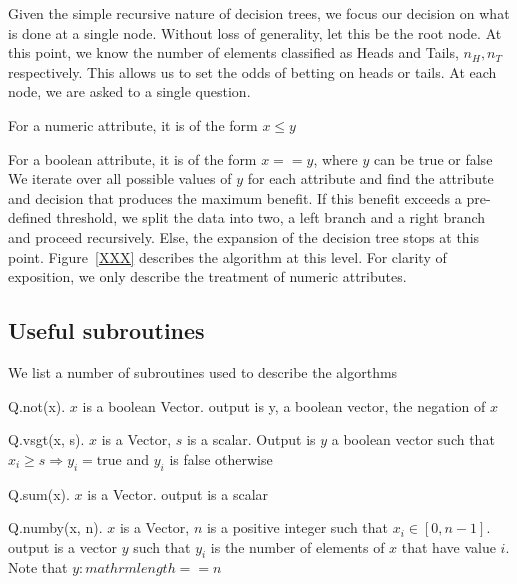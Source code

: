 Given the simple recursive nature of decision trees, we focus our 
decision on what is done at a single node. Without loss of generality, 
let this be the root node. At this point, we know the number of elements
classified as Heads and Tails, \(n_H, n_T\) respectively. This allows us to set
the odds of betting on heads or tails. At each node, we are asked to a single
question. 
\bi
\item For a numeric attribute, it is of the form \(x \leq y\)
\item For a boolean attribute, it is of the form \(x == y\), where 
\(y\) can be true or false
\ei
We iterate over all possible values of \(y\) for each attribute and find the
attribute and decision that produces the maximum benefit. If this benefit
exceeds a pre-defined threshold, we split the data into two, a left branch and a
right branch and proceed recursively. Else, the expansion of the decision tree
stops at this point.
Figure~\ref{XXX} describes the algorithm at this level. For clarity of 
exposition, we only describe the treatment of numeric attributes.


\subsection{Useful subroutines}
We list a number of subroutines used to describe the algorthms
\be
\item Q.not(x). \(x\) is a boolean Vector. output is y, a boolean vector, the
negation of \(x\)
\item Q.vsgt(x, s). \(x\) is a Vector, \(s\) is a scalar. Output is \(y\) a
boolean vector such that \(x_i \geq s \Rightarrow y_i = \mathrm{true}\) and
\(y_i\) is false otherwise
\item Q.sum(x). \(x\) is a Vector. output is a scalar
\item Q.numby(x, n). \(x\) is a Vector, \(n\) is a positive integer 
such that \(x_i \in [0, n-1]\). output is a vector \(y\) such that \(y_i\) is
the number of elements of \(x\) that have value \(i\). Note that
\(y:mathrm{length} == n\)
\ee

